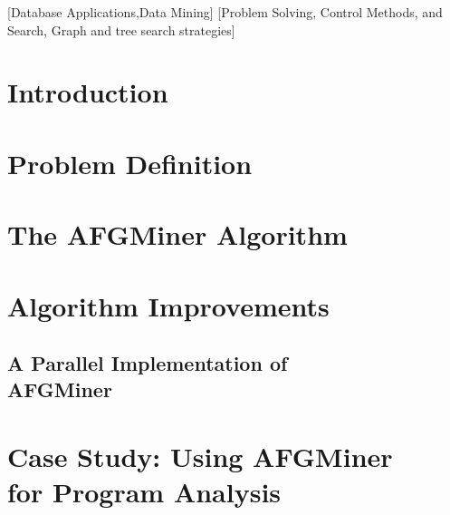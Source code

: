 \documentclass{acm_proc_article-sp}
\begin{document}
[Database Applications,Data Mining]
[Problem Solving, Control Methods, and Search, Graph and tree search strategies]




\section{Introduction}
	\label{sec:intro}
	

\section{Problem Definition}
        \label{sec:ProblemDef}
        
%	

\section{The AFGMiner Algorithm}
	\label{sec:AFGMiner}
	

\section{Algorithm Improvements}
	\label{sec:Improvements}
	
        \subsection{A Parallel Implementation of\\ 
              AFGMiner}
	\label{sec:pAFGMiner}
	
	
\section{Case Study: Using AFGMiner\\
              for Program Analysis}
	\label{sec:CaseStudies}
	
\end{document}
